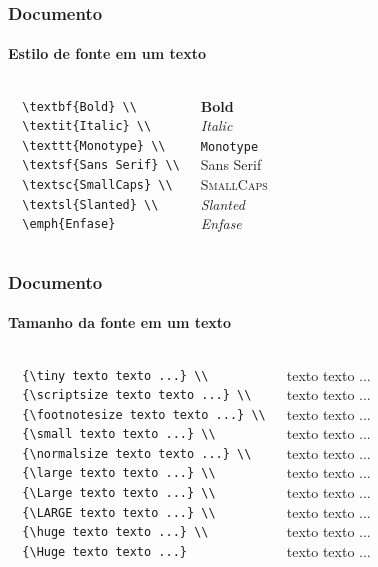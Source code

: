 \begin{frame}[fragile]
\frametitle{Documento}
\framesubtitle{Estilo de fonte em um texto}
  \begin{columns}[c]
  \begin{verbatim}
  \textbf{Bold} \\
  \textit{Italic} \\
  \texttt{Monotype} \\
  \textsf{Sans Serif} \\
  \textsc{SmallCaps} \\
  \textsl{Slanted} \\
  \emph{Enfase}
  \end{verbatim} 
  \begin{fmpage}{\textwidth}
  \textbf{Bold} \\
  \textit{Italic} \\
  \texttt{Monotype} \\
  \textsf{Sans Serif} \\
  \textsc{SmallCaps} \\
  \textsl{Slanted} \\
  \emph{Enfase}
  \end{fmpage}
  \end{columns}
\end{frame}


\begin{frame}[fragile]
\frametitle{Documento}
\framesubtitle{Tamanho da fonte em um texto}
  \begin{columns}[c]
  \scriptsize
  \begin{verbatim}
  {\tiny texto texto ...} \\
  {\scriptsize texto texto ...} \\
  {\footnotesize texto texto ...} \\
  {\small texto texto ...} \\
  {\normalsize texto texto ...} \\
  {\large texto texto ...} \\
  {\Large texto texto ...} \\
  {\LARGE texto texto ...} \\
  {\huge texto texto ...} \\
  {\Huge texto texto ...}
  \end{verbatim} 
  \begin{fmpage}{\textwidth}
  {\tiny texto texto ...} \\
  {\scriptsize texto texto ...} \\
  {\footnotesize texto texto ...} \\
  {\small texto texto ...} \\
  {\normalsize texto texto ...} \\
  {\large texto texto ...} \\
  {\Large texto texto ...} \\
  {\LARGE texto texto ...} \\
  {\huge texto texto ...} \\
  {\Huge texto texto ...}
  \end{fmpage}
  \end{columns}
\end{frame}


